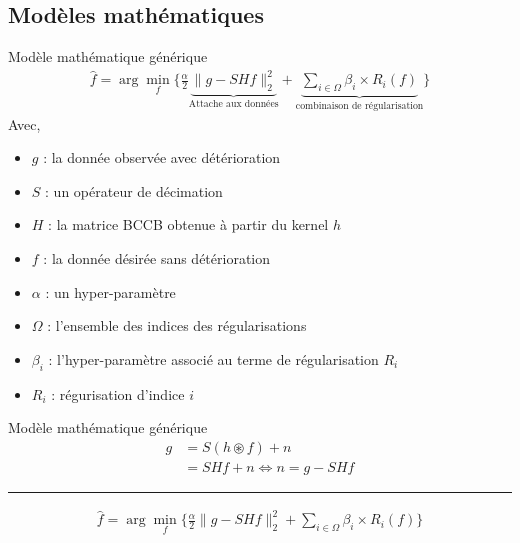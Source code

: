 \subsection{Modèles mathématiques}

\frame{
    \tableofcontents[ 
        currentsubsection, 
    ]
}

\begin{frame}{Modèle mathématique générique}
\begin{align*}
\hat{f} = \arg\min\limits_{f} \{ 
    \frac{\alpha}{2} 
    \underbrace{\lVert g - SHf \rVert_{2}^{2}}_{\text{Attache aux données}} 
    + \underbrace{
        \sum\limits_{i \in \Omega} \beta_{i} \times R_{i}(f)
    }_{\text{combinaison de régularisation}}
\} 
\end{align*}
Avec, \begin{itemize}
\item $g$ : la donnée observée avec détérioration
\item $S$ : un opérateur de décimation
\item $H$ : la matrice BCCB obtenue à partir du kernel $h$
\item $f$ : la donnée désirée sans détérioration
\item $\alpha$ : un hyper-paramètre
\item $\Omega$ : l'ensemble des indices des régularisations
\item $\beta_{i}$ : l'hyper-paramètre associé au terme 
    de régularisation $R_{i}$
\item $R_{i}$ : régurisation d'indice $i$ \\
\end{itemize}
\end{frame}

\begin{frame}{Modèle mathématique générique}
\begin{align*}
g &= S(h \circledast f) + n \\
&= S H f + n \iff n = g - S H f
\end{align*}
\hrule
\begin{align*}
\hat{f} = \arg\min\limits_{f} \{ 
    \frac{\alpha}{2} 
    \lVert g - SHf \rVert_{2}^{2}
    + \sum\limits_{i \in \Omega} \beta_{i} \times R_{i}(f)
\}  
\end{align*}
\end{frame}

